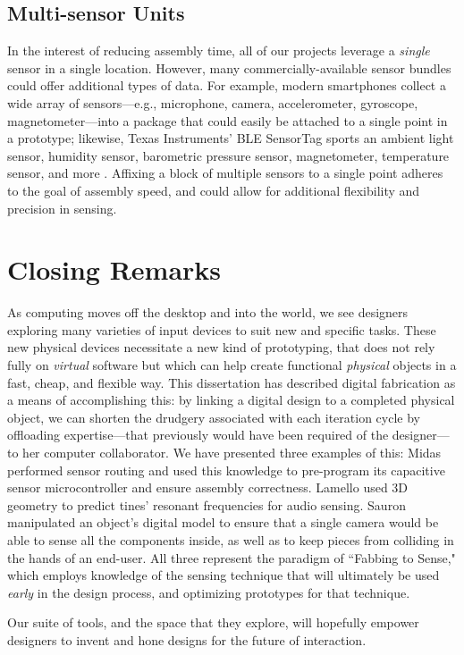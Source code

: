 \subsection{Multi-sensor Units}

In the interest of reducing assembly time, all of our projects leverage a \emph{single} sensor in a single location. However, many commercially-available sensor bundles could offer additional types of data. For example, modern smartphones collect a wide array of sensors---e.g., microphone, camera, accelerometer, gyroscope, magnetometer---into a package that could easily be attached to a single point in a prototype; likewise, Texas Instruments' BLE SensorTag sports an ambient light sensor, humidity sensor, barometric pressure sensor, magnetometer, temperature sensor, and more \cite{ti-sensortag}. Affixing a block of multiple sensors to a single point adheres to the goal of assembly speed, and could allow for additional flexibility and precision in sensing.

\section{Closing Remarks}

As computing moves off the desktop and into the world, we see designers exploring many varieties of input devices to suit new and specific tasks. These new physical devices necessitate a new kind of prototyping, that does not rely fully on \emph{virtual} software but which can help create functional \emph{physical} objects in a fast, cheap, and flexible way. This dissertation has described digital fabrication as a means of accomplishing this: by linking a digital design to a completed physical object, we can shorten the drudgery associated with each iteration cycle by offloading expertise---that previously would have been required of the designer---to her computer collaborator. We have presented three examples of this: Midas performed sensor routing and used this knowledge to pre-program its capacitive sensor microcontroller and ensure assembly correctness. Lamello used 3D geometry to predict tines' resonant frequencies for audio sensing. Sauron manipulated an object's digital model to ensure that a single camera would be able to sense all the components inside, as well as to keep pieces from colliding in the hands of an end-user. All three represent the paradigm of ``Fabbing to Sense," which employs knowledge of the sensing technique that will ultimately be used \emph{early} in the design process, and optimizing prototypes for that technique.

Our suite of tools, and the space that they explore, will hopefully empower designers to invent and hone designs for the future of interaction.